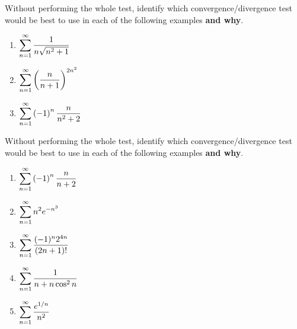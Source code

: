 \documentclass[12pt]{article}
\begin{document}
\Examples Without performing the whole test, identify which convergence/divergence test would be best to use in each of the following examples \textbf{and why}.

\begin{enumerate}
\item[\tc{1}] $\displaystyle\sum_{n=1}^\infty\dfrac{1}{n\sqrt{n^2+1}}$

\vfill

\item[\tc{2}] $\displaystyle\sum_{n=1}^\infty\left(\dfrac{n}{n+1}\right)^{2n^2}$

\vfill

\item[\tc{3}] $\displaystyle\sum_{n=1}^\infty\left(-1\right)^n\dfrac{n}{n^2+2}$

\vfill

\end{enumerate}

\newpage

\ExamplesCont Without performing the whole test, identify which convergence/divergence test would be best to use in each of the following examples \textbf{and why}.

\begin{enumerate}

\item[\tc{4}] $\displaystyle\sum_{n=1}^\infty\left(-1\right)^n\dfrac{n}{n+2}$

\vfill

\item[\tc{5}] $\displaystyle\sum_{n=1}^\infty n^2e^{-n^3}$

\vfill

\item[\tc{6}] $\displaystyle\sum_{n=1}^\infty\dfrac{(-1)^n2^{4n}}{(2n+1)!}$

\vfill

\item[\tc{7}] $\displaystyle\sum_{n=1}^\infty\dfrac{1}{n+n\cos^2n}$

\vfill

\item[\tc{8}] $\displaystyle\sum_{n=1}^\infty\dfrac{e^{1/n}}{n^2}$

\vfill

\end{enumerate}
\end{document}
